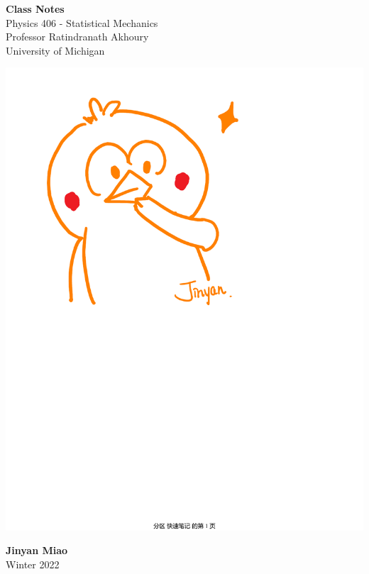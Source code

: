 \documentclass[11pt,oneside]{book}
\theoremstyle{break}
\theoremstyle{break}
\begin{document}
	\begin{titlepage}
		\begin{center}
			\vspace*{\fill}
			\Huge \color{red}
				\textbf{Class Notes}\\
			\vspace{0.5cm}			
			\Large \color{black}
				Physics 406 - Statistical Mechanics\\	
				Professor Ratindranath Akhoury\\
				University of Michigan\\
			\vspace{3cm}
			
			\begin{center}
			\includegraphics[scale=0.8]{hmm.pdf}
			\end{center}

			
			\vspace{5cm}
			\LARGE
				\textbf{Jinyan Miao}\\
				Winter 2022\\
			\vspace{5cm}

		\vspace*{\fill}
		\end{center}			
	\end{titlepage}
\end{document}
